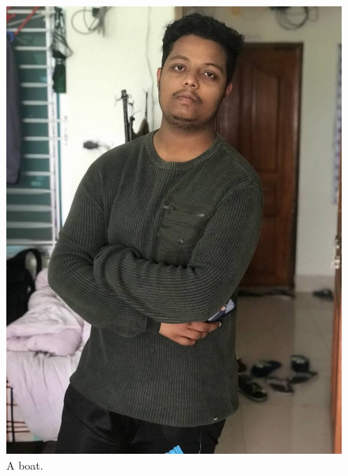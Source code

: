 \documentclass{article}
\begin{document}
	\begin{figure}
	\includegraphics[width=\linewidth]{shaikat.jpg}
	\caption{A boat.}
	\label{fig:boat1}
	\end{figure}
\end{document}
